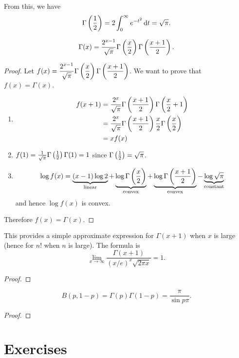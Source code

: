From this, we have
\[\Gamma\left(\frac{1}{2}\right)=2\int_0^\infty e^{-t^2}\dd{t=\sqrt{\pi}.}\]

\begin{lemma}
\[\Gamma(x)=\frac{2^{x-1}}{\sqrt{\pi}}\Gamma\left(\frac{x}{2}\right)\Gamma\left(\frac{x+1}{2}\right).\]
\end{lemma}

\begin{proof}
Let $\displaystyle f(x)=\frac{2^{x-1}}{\sqrt{\pi}}\Gamma\left(\frac{x}{2}\right)\Gamma\left(\frac{x+1}{2}\right)$. We want to prove that $f(x)=\Gamma(x)$.
\begin{enumerate}[label=(\roman*)]
\item \begin{align*}
f(x+1)&=\frac{2^x}{\sqrt{\pi}}\Gamma\left(\frac{x+1}{2}\right)\Gamma\left(\frac{x}{2}+1\right)\\
&=\frac{2^x}{\sqrt{\pi}}\Gamma\left(\frac{x+1}{2}\right)\frac{x}{2}\Gamma\left(\frac{x}{2}\right)\\
&=xf(x)
\end{align*}
\item $f(1)=\frac{1}{\sqrt{\pi}}\Gamma\left(\frac{1}{2}\right)\Gamma(1)=1$ since $\Gamma\left(\frac{1}{2}\right)=\sqrt{\pi}$.
\item \[\log f(x)=\underbrace{(x-1)\log2}_\text{linear}+\underbrace{\log\Gamma\left(\frac{x}{2}\right)}_\text{convex}+\underbrace{\log\Gamma\left(\frac{x+1}{2}\right)}_\text{convex}-\underbrace{\log\sqrt{\pi}}_\text{constant}\]
and hence $\log f(x)$ is convex.
\end{enumerate}
Therefore $f(x)=\Gamma(x)$.
\end{proof}

\begin{theorem}
This provides a simple approximate expression for $\Gamma(x+1)$ when $x$ is large (hence for $n!$ when $n$ is large). The formula is
\begin{equation}
\lim_{x\to\infty}\frac{\Gamma(x+1)}{(x/e)^x\sqrt{2\pi x}}=1.
\end{equation}
\end{theorem}

\begin{proof}

\end{proof}

\begin{lemma}
\[B(p,1-p)=\Gamma(p)\Gamma(1-p)=\frac{\pi}{\sin p\pi}.\]
\end{lemma}

\begin{proof}

\end{proof}
\pagebreak

\section*{Exercises}
